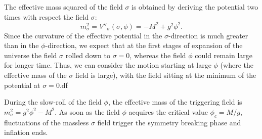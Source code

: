 \documentclass[11pt,a4paper,twoside]{book}
\begin{document}
The effective mass squared of the field $\sigma$ is obtained by deriving the potential two times with respect the field $\sigma$:
\begin{equation}
	\label{massEffectiveSigma}
	m^{2}_{\sigma} = V''_{\sigma}(\sigma,\phi) = -M^{2} + g^{2}\phi^{2}.
\end{equation}
 Since the curvature of the effective potential in the $\sigma$-direction is much greater than in the $\phi$-direction, we expect that at the first stages of expansion of the universe the field $\sigma$ rolled down to $\sigma=0$, whereas the field $\phi$ could remain large for longer time. Thus, we can consider the motion starting at large $\phi$ (where the effective mass of the $\sigma$ field is large), with the field  sitting at the minimum of the potential at $\sigma=0$.df
 
 During the slow-roll of the field $\phi$, the effective mass of the triggering field is $ m^{2}_{\sigma} = g^{2}\phi^{2}-M^{2}$. As soon as the field $\phi$ acquires the critical value $\phi_{c}=M/g$, fluctuations of the massless $\sigma$ field trigger the symmetry breaking phase and inflation ends. 
 
\end{document}
